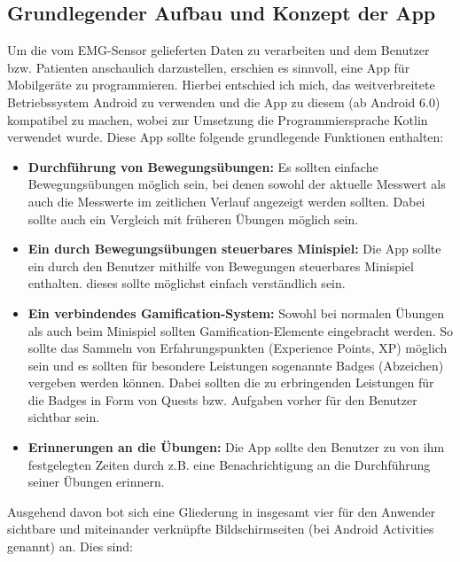 \subsection{Grundlegender Aufbau und Konzept der App}
Um die vom EMG-Sensor gelieferten Daten zu verarbeiten und dem Benutzer bzw. Patienten anschaulich darzustellen, erschien es sinnvoll, eine App für Mobilgeräte zu programmieren. Hierbei entschied ich mich, das weitverbreitete Betriebssystem Android zu verwenden und die App zu diesem (ab Android 6.0) kompatibel zu machen, wobei zur Umsetzung die Programmiersprache Kotlin\cite{Src:Kotlin} verwendet wurde. Diese App sollte folgende grundlegende Funktionen enthalten:
\begin{itemize}
	\item \textbf{Durchführung von Bewegungsübungen:} Es sollten einfache Bewegungsübungen möglich sein, bei denen sowohl der aktuelle Messwert als auch die Messwerte im zeitlichen Verlauf angezeigt werden sollten. Dabei sollte auch ein Vergleich mit früheren Übungen möglich sein.
	\item \textbf{Ein durch Bewegungsübungen steuerbares Minispiel:} Die App sollte ein durch den Benutzer mithilfe von Bewegungen steuerbares Minispiel enthalten. dieses sollte möglichst einfach verständlich sein.
	\item \textbf{Ein verbindendes Gamification-System:} Sowohl bei normalen Übungen als auch beim Minispiel sollten Gamification-Elemente eingebracht werden. So sollte das Sammeln von Erfahrungspunkten (Experience Points, XP) möglich sein und es sollten für besondere Leistungen sogenannte Badges (Abzeichen) vergeben werden können. Dabei sollten die zu erbringenden Leistungen für die Badges in Form von Quests bzw. Aufgaben vorher für den Benutzer sichtbar sein.
	\item \textbf{Erinnerungen an die Übungen:} Die App sollte den Benutzer zu von ihm festgelegten Zeiten durch z.B. eine Benachrichtigung an die Durchführung seiner Übungen erinnern.
\end{itemize}
Ausgehend davon bot sich eine Gliederung in insgesamt vier für den Anwender sichtbare und miteinander verknüpfte Bildschirmseiten (bei Android Activities\cite{Src:AndroidKuenneth} genannt) an. Dies sind:
